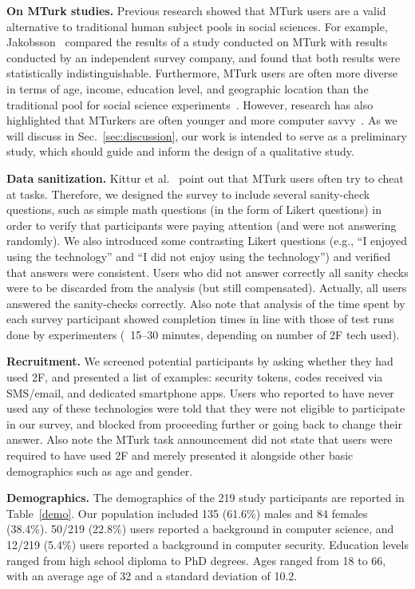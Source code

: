 \documentclass[conference]{IEEEtran}
\newcommand{\descr}[1]{\vspace{0.25cm} \noindent \textbf{#1}}
\begin{document}
\descr{On MTurk studies.} Previous research showed that MTurk users are a valid alternative to traditional human subject pools in social sciences. For example, Jakobsson~\cite{jakobsson2009experimenting} compared the results of a study conducted on MTurk with results conducted by an independent survey company, and found that both results were statistically indistinguishable. Furthermore, MTurk users are often more diverse in terms of age, income, education level, and geographic location than the traditional pool for social science experiments~\cite{henrich2010weirdest}.
However, research has also highlighted that MTurkers are often younger and more computer savvy~\cite{Christenson:2013}. As we will discuss in Sec.~\ref{sec:discussion}, our work is intended to serve as a preliminary study, which should guide and inform the design of a qualitative study. 


\descr{Data sanitization.} Kittur et al.~\cite{kittur2008crowdsourcing} point out that MTurk users often try to cheat at tasks. Therefore, we designed the survey to include several sanity-check questions, such as simple math questions (in the form of Likert questions) in order to verify that participants were paying attention (and were not answering randomly). We also introduced some contrasting Likert questions (e.g., ``I enjoyed using the technology'' and ``I did not enjoy using the technology'') and verified that answers were consistent. Users who did not answer correctly all sanity checks were to be discarded from the analysis (but still compensated). Actually, all users answered the sanity-checks correctly. 
Also note that analysis of the time spent by each survey participant showed completion times in line with those of test runs done by experimenters (~15--30 minutes, depending on number of 2F tech used). 

\descr{Recruitment.} We screened potential participants by asking whether they had used 2F, and presented a list of examples: security tokens, codes received via SMS/email, and dedicated smartphone apps. Users who reported to have never used any of these technologies were told that they were not eligible to participate in our survey, and blocked from proceeding further or going back to change their answer. Also note the MTurk task announcement did not state that users were required to have used 2F and merely presented it alongside other basic demographics such as age and gender. 



\descr{Demographics.} The demographics of the 219 study participants are reported in Table~\ref{demo}. Our population included 135 (61.6\%) males and 84 females (38.4\%). 50/219 (22.8\%) users reported a background in computer science, and 12/219 (5.4\%) users reported a background in computer security. Education levels ranged from high school diploma to PhD degrees. Ages ranged from 18 to 66, with an average age of 32 and a standard deviation of 10.2.
\end{document}
